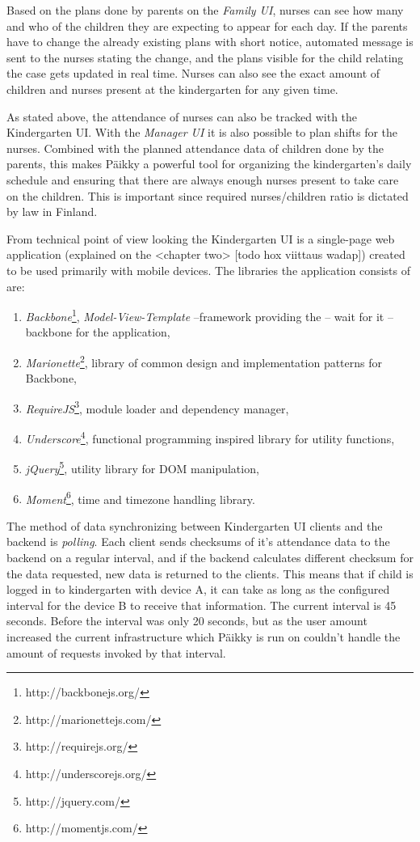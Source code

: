 Based on the plans done by parents on the \textit{Family UI}, nurses can see how many and who of the children they are expecting to appear for each day. If the parents have to change the already existing plans with short notice, automated message is sent to the nurses stating the change, and the plans visible for the child relating the case gets updated in real time. Nurses can also see the exact amount of children and nurses present at the kindergarten for any given time.

As stated above, the attendance of nurses can also be tracked with the Kindergarten UI. With the \textit{Manager UI} it is also possible to plan shifts for the nurses. Combined with the planned attendance data of children done by the parents, this makes Päikky a powerful tool for organizing the kindergarten's daily schedule and ensuring that there are always enough nurses present to take care on the children. This is important since required nurses/children ratio is dictated by law in Finland. %

From technical point of view looking the Kindergarten UI is a single-page web application (explained on the <chapter two> [todo hox viittaus wadap]) created to be used primarily with mobile devices. The libraries the application consists of are: %

\begin{enumerate}
	\item \textit{Backbone}\footnote{http://backbonejs.org/}, \textit{Model-View-Template} –framework providing the – wait for it – backbone for the application,
	\item \textit{Marionette}\footnote{http://marionettejs.com/}, library of common design and implementation patterns for Backbone,
	\item \textit{RequireJS}\footnote{http://requirejs.org/}, module loader and dependency manager,
	\item \textit{Underscore}\footnote{http://underscorejs.org/}, functional programming inspired library for utility functions,
	\item \textit{jQuery}\footnote{http://jquery.com/}, utility library for DOM manipulation,
	\item \textit{Moment}\footnote{http://momentjs.com/}, time and timezone handling library. 
\end{enumerate}


The method of data synchronizing between Kindergarten UI clients and the backend is \textit{polling}. Each client sends checksums of it's attendance data to the backend on a regular interval, and if the backend calculates different checksum for the data requested, new data is returned to the clients. This means that if child is logged in to kindergarten with device A, it can take as long as the configured interval for the device B to receive that information. The current interval is 45 seconds. Before the interval was only 20 seconds, but as the user amount increased the current infrastructure which Päikky is run on couldn't handle the amount of requests invoked by that interval. 

